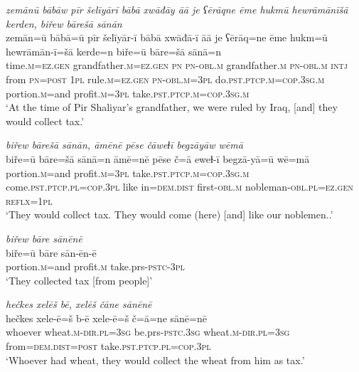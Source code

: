\ea \label{BP.11}
\textit{zemānū bābāw pīr šelīyārī bābā xwāđāy āā je ʕērāqne ēme hukmū hewrāmānīšā kerden, biřew bārešā sānān} \\ 
\gll zemān=ū bābā=ū pīr šelīyār-ī bābā xwāđā-ī āā je ʕērāq=ne ēme hukm=ū hewrāmān-ī=šā kerde=n biře=ū bāre=šā sānā=n \\ 
 time\textsc{.m}\textsc{=ez.gen} grandfather\textsc{.m}\textsc{=ez.gen} \textsc{pn} \textsc{pn}\textsc{-obl}\textsc{.m} grandfather\textsc{.m} \textsc{pn}\textsc{-obl}\textsc{.m} \textsc{intj} from \textsc{pn}\textsc{=\textsc{post}} \textsc{1pl} rule\textsc{.m}\textsc{=ez.gen} \textsc{pn}\textsc{-obl}\textsc{.m}\textsc{=3pl} do\textsc{.pst}\textsc{.ptcp}\textsc{.m}\textsc{=cop}\textsc{.3sg}\textsc{.m} portion\textsc{.m}=and profit\textsc{.m}\textsc{=3pl} take\textsc{.pst}\textsc{.ptcp}\textsc{.m}\textsc{=cop}\textsc{.3sg}\textsc{.m} \\ 
\glt `At the time of Pir Shaliyar’s grandfather, we were ruled by Iraq, [and] they would collect tax.'
\z 
 
\ea \label{BP.12}
\textit{biřew bārešā sānān, āmēnē pēse čāweɫī begzāyāw wēmā} \\ 
\gll biře=ū bāre=šā sānā=n āmē=nē pēse č=ā eweɫ-ī begzā-yā=ū wē=mā \\ 
 portion\textsc{.m}=and profit\textsc{.m}\textsc{=3pl} take\textsc{.pst}\textsc{.ptcp}\textsc{.m}\textsc{=cop}\textsc{.3sg}\textsc{.m} come\textsc{.pst}\textsc{.ptcp}\textsc{.pl}\textsc{=cop}\textsc{.3pl} like in=\textsc{dem.dist} first\textsc{-obl}\textsc{.m} nobleman\textsc{-obl}\textsc{.pl}\textsc{=ez.gen} \textsc{reflx}\textsc{=\textsc{1pl}} \\ 
\glt `They would collect tax. They would come (here) [and] like our noblemen..'
\z 
 
\ea \label{BP.14}
\textit{biřew bāre sānēnē} \\ 
\gll biře=ū bāre sān-ēn-ē \\ 
 portion\textsc{.m}=and profit\textsc{.m} take.prs\textsc{-pstc}\textsc{-3pl} \\ 
\glt `They collected tax [from people]'
\z 
 
\ea \label{BP.15}
\textit{hečkes xelēš bē, xelēš čāne sānēnē} \\ 
\gll hečkes xele-ē=š b-ē xele-ē=š č=ā=ne sānē=nē \\ 
 whoever wheat\textsc{.m}\textsc{-dir}\textsc{.pl}\textsc{=3sg} be.prs\textsc{-pstc}\textsc{.3sg} wheat\textsc{.m}\textsc{-dir}\textsc{.pl}\textsc{=3sg} from=\textsc{dem.dist}\textsc{=\textsc{post}} take\textsc{.pst}\textsc{.ptcp}\textsc{.pl}\textsc{=cop}\textsc{.3pl} \\ 
\glt `Whoever had wheat, they would collect the wheat from him as tax.'
\z 
 
